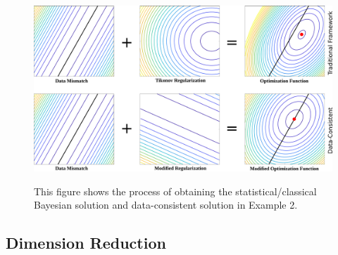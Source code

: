 \documentclass[11pt]{beamer}
\begin{document}
\begin{frame}


\begin{figure} 
\includegraphics[scale=0.2]{Regularization-all-in-one.pdf}

This figure \footnotemark[1] shows the process of obtaining the statistical/classical Bayesian solution and data-consistent solution in Example 2.
\end{figure}


\end{frame}

\subsection{Dimension Reduction}
\end{document}
